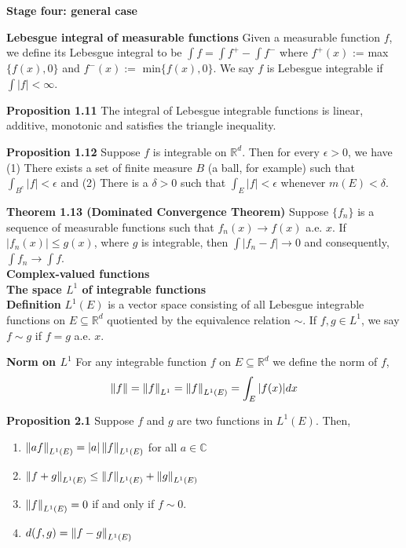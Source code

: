 \documentclass[6pt,landscape]{article}
\begin{document}
\begin{multicols*}{3}
\textbf{Stage four: general case}

\textbf{Lebesgue integral of measurable functions} Given a measurable function $f$, we define its Lebesgue integral to be $\int f = \int f^{+} - \int f^{-}$ where $f^{+}(x)$ := max$\{f(x),0\}$ and
$f^{-}(x) :=$ min$\{f(x),0\}$. We say $f$ is Lebesgue integrable if $\int |f| < \infty$.

\textbf{Proposition 1.11} The integral of Lebesgue integrable functions is linear, additive, monotonic and satisfies the triangle inequality.

\textbf{Proposition 1.12} Suppose $f$ is integrable on $\mathbb{R}^d$. Then for every $\epsilon>0$, we have (1) There exists a set of finite measure $B$ (a ball, for example) such that 
$\int_{B^c} |f| < \epsilon$ and (2) There is a $\delta>0$ such that $\int_E |f|<\epsilon$ whenever $m(E)<\delta$.

\textbf{Theorem 1.13 (Dominated Convergence Theorem)} Suppose $\{f_n\}$ is a sequence of measurable functions such that $f_n(x) \to f(x)$ a.e. $x$. If $|f_n(x)|\leq g(x)$, where $g$ is integrable,
then $\int |f_n-f| \to 0$ and consequently, $\int f_n \to \int f$.\\

\textbf{Complex-valued functions}\\

\textbf{The space $L^1$ of integrable functions}\\

\textbf{Definition} $L^1(E)$ is a vector space consisting of all Lebesgue integrable functions on $E\subseteq\mathbb{R}^d$ quotiented by the 
equivalence relation $\sim$. If $f,g\in L^1$, we say $f\sim g$ if $f=g$ a.e. $x$.

\textbf{Norm on $L^1$} For any integrable function $f$ on $E\subseteq \mathbb{R}^d$ we define the norm of $f$,
\[ \left\lVert f\right\rVert = \left\lVert f\right\rVert_{L^1} = \left\lVert f\right\rVert_{L^1(E)} = \int_E |f(x)|dx \]

\textbf{Proposition 2.1} Suppose $f$ and $g$ are two functions in $L^1(E)$. Then,
\begin{enumerate}
	\item $\left\lVert af\right\rVert_{L^1(E)} = |a|\left\lVert f\right\rVert_{L^1(E)}$ for all $a\in\mathbb{C}$
	\item $\left\lVert f+g\right\rVert_{L^1(E)} \leq \left\lVert f\right\rVert_{L^1(E)} + \left\lVert g\right\rVert_{L^1(E)}$
	\item $\left\lVert f\right\rVert_{L^1(E)} = 0$ if and only if $f\sim 0$.
	\item $d(f,g) = \left\lVert f-g\right\rVert_{L^1(E)}$
\end{enumerate}


\end{multicols*}
\end{document}

